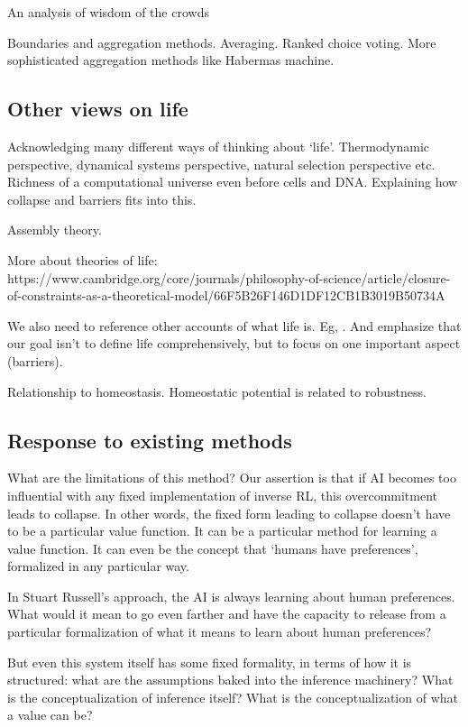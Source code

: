 An analysis of wisdom of the crowds \citep{farrell2023analytical}

Boundaries and aggregation methods. Averaging. Ranked choice voting. More sophisticated aggregation methods like Habermas machine.


\subsection{Other views on life}

Acknowledging many different ways of thinking about `life'. Thermodynamic perspective, dynamical systems perspective, natural selection perspective etc. Richness of a computational universe even before cells and DNA. Explaining how collapse and barriers fits into this. 

Assembly theory.

More about theories of life: https://www.cambridge.org/core/journals/philosophy-of-science/article/closure-of-constraints-as-a-theoretical-model/66F5B26F146D1DF12CB1B3019B50734A

We also need to reference other accounts of what life is. Eg, \citep{bedau2023what}. And emphasize that our goal isn't to define life comprehensively, but to focus on one important aspect (barriers).

Relationship to homeostasis. Homeostatic potential is related to robustness. 


\subsection{Response to existing methods}

What are the limitations of this method? Our assertion is that if AI becomes too influential with any fixed implementation of inverse RL, this overcommitment leads to collapse. In other words, the fixed form leading to collapse doesn't have to be a particular value function. It can be a particular method for learning a value function. It can even be the concept that `humans have preferences', formalized in any particular way.

In Stuart Russell's approach, the AI is always learning about human preferences. What would it mean to go even farther and have the capacity to release from a particular formalization of what it means to learn about human preferences?

But even this system itself has some fixed formality, in terms of how it is structured: what are the assumptions baked into the inference machinery? What is the conceptualization of inference itself? What is the conceptualization of what a value can be?

